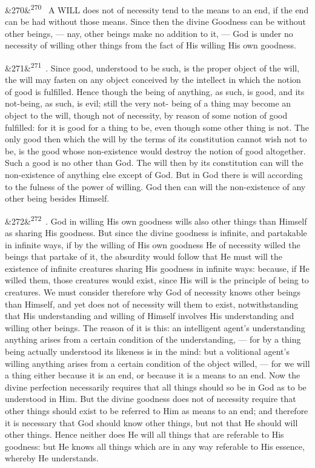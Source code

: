 \documentclass[12pt]{article}
\newcommand{\para}[1][]{\par\noindent\ifx&#1&\else\textsuperscript{\footnotesize #1}~\fi}
\begin{document}
\para[270] A WILL does not of necessity tend to the means to an end, if the end can be had without those means. Since then the divine Goodness can be without other beings, --- nay, other beings make no addition to it, --- God is under no necessity of willing other things from the fact of His willing His own goodness.

\para[271] 2. Since good, understood to be such, is the proper object of the will, the will may fasten on any object conceived by the intellect in which the notion of good is fulfilled. Hence though the being of anything, as such, is good, and its not-being, as such, is evil; still the very not- being of a thing may become an object to the will, though not of necessity, by reason of some notion of good fulfilled: for it is good for a thing to be, even though some other thing is not. The only good then which the will by the terms of its constitution cannot wish not to be, is the good whose non-existence would destroy the notion of good altogether. Such a good is no other than God. The will then by its constitution can will the non-existence of anything else except of God. But in God there is will according to the fulness of the power of willing. God then can will the non-existence of any other being besides Himself.

\para[272] 3. God in willing His own goodness wills also other things than Himself as sharing His goodness. But since the divine goodness is infinite, and partakable in infinite ways, if by the willing of His own goodness He of necessity willed the beings that partake of it, the absurdity would follow that He must will the existence of infinite creatures sharing His goodness in infinite ways: because, if He willed them, those creatures would exist, since His will is the principle of being to creatures. We must consider therefore why God of necessity knows other beings than Himself, and yet does not of necessity will them to exist, notwithstanding that His understanding and willing of Himself involves His understanding and willing other beings. The reason of it is this: an intelligent agent's understanding anything arises from a certain condition of the understanding, --- for by a thing being actually understood its likeness is in the mind: but a volitional agent's willing anything arises from a certain condition of the object willed, --- for we will a thing either because it is an end, or because it is a means to an end. Now the divine perfection necessarily requires that all things should so be in God as to be understood in Him. But the divine goodness does not of necessity require that other things should exist to be referred to Him as means to an end; and therefore it is necessary that God should know other things, but not that He should will other things. Hence neither does He will all things that are referable to His goodness: but He knows all things which are in any way referable to His essence, whereby He understands.
\end{document}
